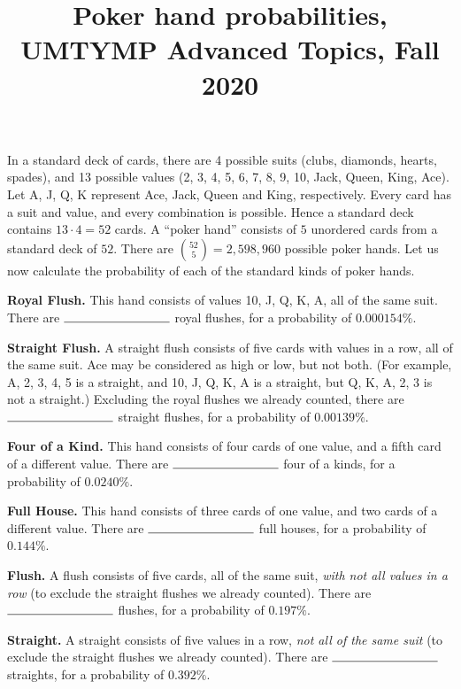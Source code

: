\documentclass[11pt]{article}
\title{Poker hand probabilities, \\ UMTYMP Advanced Topics, Fall 2020}
\date{}
\begin{document}
\maketitle

\thispagestyle{empty}

\vspace{-1cm}

In a standard deck of cards, there are 4 possible suits (clubs, diamonds, hearts, spades), and 13 possible values (2, 3, 4, 5, 6, 7, 8, 9, 10, Jack, Queen, King, Ace). Let A, J, Q, K represent Ace, Jack, Queen and King, respectively. Every card has a suit and value, and every combination is possible. Hence a standard deck contains $13 \cdot 4 = 52$ cards. A ``poker hand'' consists of $5$ unordered cards from a standard deck of $52$. There are $\binom{52}{5} = 2, 598, 960$ possible poker hands. Let us now calculate the probability of each of the standard kinds of poker hands.

{\bf Royal Flush.} This hand consists of values 10, J, Q, K, A, all of the same suit. There are $\rule{3cm}{0.15mm}$ royal flushes, for a probability of $0.000154\%$.

{\bf Straight Flush.} A straight flush consists of five cards with values in a row, all of the same suit. Ace may be considered as high or low, but not both. (For example, A, 2, 3, 4, 5 is a straight, and 10, J, Q, K, A is a straight, but Q, K, A, 2, 3 is not a straight.) Excluding the royal flushes we already counted, there are $\rule{3cm}{0.15mm}$ straight flushes, for a probability of $0.00139\%$.

{\bf Four of a Kind.} This hand consists of four cards of one value, and a fifth card of a different value. There are $\rule{3cm}{0.15mm}$ four of a kinds, for a probability of  $0.0240\%$.

{\bf Full House.} This hand consists of three cards of one value, and two cards of a different value. There are $\rule{3cm}{0.15mm}$ full houses, for a probability of $0.144\%$.

{\bf Flush.} A flush consists of five cards, all of the same suit, \emph{with not all values in a row} (to exclude the straight flushes we already counted). There are $\rule{3cm}{0.15mm}$ flushes, for a probability of $0.197\%$.

{\bf Straight.} A straight consists of five values in a row, \emph{not all of the same suit} (to exclude the straight flushes we already counted). There are $\rule{3cm}{0.15mm}$ straights, for a probability of $0.392\%$.
\end{document}
